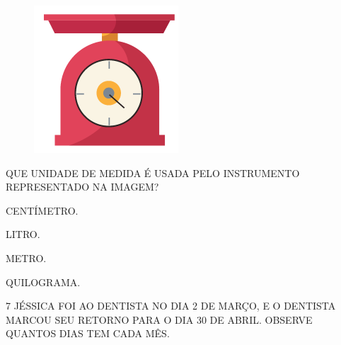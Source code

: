 \begin{figure}[H]
\centering
\includegraphics[width=\textwidth]{./media/SAEB_1ANO_MAT_FIGURA123.png}
\end{figure}

QUE UNIDADE DE MEDIDA É USADA PELO INSTRUMENTO REPRESENTADO NA IMAGEM?

\begin{escolha}[itemsep=0pt]
\item CENTÍMETRO.

\item LITRO.

\item METRO.

\item QUILOGRAMA.
\end{escolha}

\num{7} JÉSSICA FOI AO DENTISTA NO DIA 2 DE MARÇO, E O DENTISTA MARCOU SEU
RETORNO PARA O DIA 30 DE ABRIL. OBSERVE QUANTOS DIAS TEM CADA MÊS.

